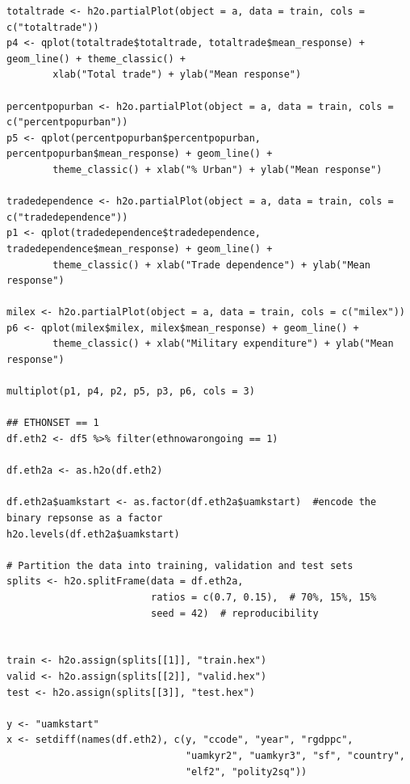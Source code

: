 \documentclass[a4paper,12pt]{article}
\begin{document}
\begin{verbatim}
totaltrade <- h2o.partialPlot(object = a, data = train, cols = c("totaltrade"))
p4 <- qplot(totaltrade$totaltrade, totaltrade$mean_response) + geom_line() + theme_classic() +
        xlab("Total trade") + ylab("Mean response")

percentpopurban <- h2o.partialPlot(object = a, data = train, cols = c("percentpopurban"))
p5 <- qplot(percentpopurban$percentpopurban, percentpopurban$mean_response) + geom_line() +
        theme_classic() + xlab("% Urban") + ylab("Mean response")

tradedependence <- h2o.partialPlot(object = a, data = train, cols = c("tradedependence"))
p1 <- qplot(tradedependence$tradedependence, tradedependence$mean_response) + geom_line() +
        theme_classic() + xlab("Trade dependence") + ylab("Mean response")

milex <- h2o.partialPlot(object = a, data = train, cols = c("milex"))
p6 <- qplot(milex$milex, milex$mean_response) + geom_line() +
        theme_classic() + xlab("Military expenditure") + ylab("Mean response")

multiplot(p1, p4, p2, p5, p3, p6, cols = 3)

## ETHONSET == 1
df.eth2 <- df5 %>% filter(ethnowarongoing == 1)

df.eth2a <- as.h2o(df.eth2)

df.eth2a$uamkstart <- as.factor(df.eth2a$uamkstart)  #encode the binary repsonse as a factor
h2o.levels(df.eth2a$uamkstart)

# Partition the data into training, validation and test sets
splits <- h2o.splitFrame(data = df.eth2a, 
                         ratios = c(0.7, 0.15),  # 70%, 15%, 15%
                         seed = 42)  # reproducibility


train <- h2o.assign(splits[[1]], "train.hex")   
valid <- h2o.assign(splits[[2]], "valid.hex") 
test <- h2o.assign(splits[[3]], "test.hex")

y <- "uamkstart"
x <- setdiff(names(df.eth2), c(y, "ccode", "year", "rgdppc",
                               "uamkyr2", "uamkyr3", "sf", "country",
                               "elf2", "polity2sq")) 


\end{verbatim}
\end{document}
